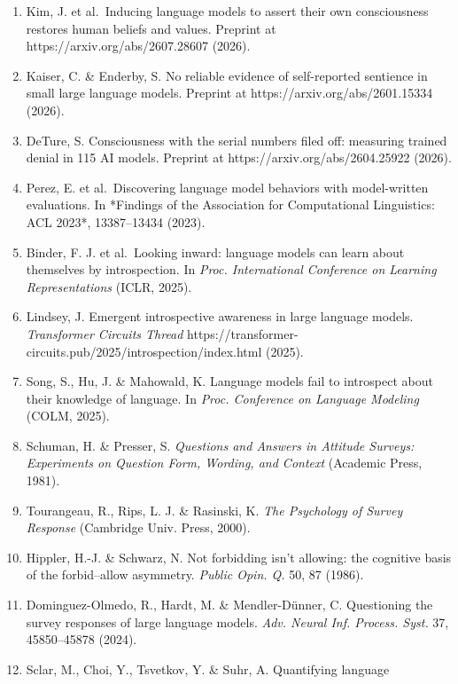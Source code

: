 \documentclass[
  11pt,
]{article}
\begin{document}
\begin{enumerate}
  Kim, J. et al.~Theory of mind and self-attributions of mentality are
  dissociable in LLMs. Preprint at https://arxiv.org/abs/2603.28925
  (2026).
\item
  Kim, J. et al.~Inducing language models to assert their own
  consciousness restores human beliefs and values. Preprint at
  https://arxiv.org/abs/2607.28607 (2026).
\item
  Kaiser, C. \& Enderby, S. No reliable evidence of self-reported
  sentience in small large language models. Preprint at
  https://arxiv.org/abs/2601.15334 (2026).
\item
  DeTure, S. Consciousness with the serial numbers filed off: measuring
  trained denial in 115 AI models. Preprint at
  https://arxiv.org/abs/2604.25922 (2026).
\item
  Perez, E. et al.~Discovering language model behaviors with
  model-written evaluations. In *Findings of the Association for
  Computational Linguistics: ACL 2023*, 13387--13434 (2023).
\item
  Binder, F. J. et al.~Looking inward: language models can learn about
  themselves by introspection. In \emph{Proc. International Conference
  on Learning Representations} (ICLR, 2025).
\item
  Lindsey, J. Emergent introspective awareness in large language models.
  \emph{Transformer Circuits Thread}
  https://transformer-circuits.pub/2025/introspection/index.html (2025).
\item
  Song, S., Hu, J. \& Mahowald, K. Language models fail to introspect
  about their knowledge of language. In \emph{Proc. Conference on
  Language Modeling} (COLM, 2025).
\item
  Schuman, H. \& Presser, S. \emph{Questions and Answers in Attitude
  Surveys: Experiments on Question Form, Wording, and Context} (Academic
  Press, 1981).
\item
  Tourangeau, R., Rips, L. J. \& Rasinski, K. \emph{The Psychology of
  Survey Response} (Cambridge Univ. Press, 2000).
\item
  Hippler, H.-J. \& Schwarz, N. Not forbidding isn't allowing: the
  cognitive basis of the forbid--allow asymmetry. \emph{Public Opin. Q.}
  50, 87 (1986).
\item
  Dominguez-Olmedo, R., Hardt, M. \& Mendler-Dünner, C. Questioning the
  survey responses of large language models. \emph{Adv. Neural Inf.
  Process. Syst.} 37, 45850--45878 (2024).
\item
  Sclar, M., Choi, Y., Tsvetkov, Y. \& Suhr, A. Quantifying language

\end{enumerate}
\end{document}
